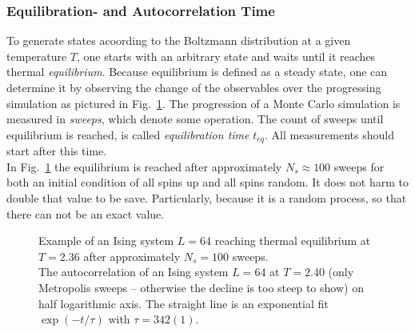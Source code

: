     \subsubsection{Equilibration- and Autocorrelation Time}
    \label{sssec:eqtime}
        To generate states acoording to the Boltzmann distribution at a
        given temperature \(T\), one starts with an arbitrary state
        and waits until it reaches thermal \emph{equilibrium}. Because
        equilibrium is defined as a steady state, one can determine it by
        observing the change of the observables over the progressing
        simulation as pictured in Fig.\ \ref{fig:equiandauto}.
        The progression of a Monte Carlo simulation is measured in \emph{sweeps},
        which denote some operation. The count of sweeps until
        equilibrium is reached, is called \emph{equilibration time} \(t_{eq}\).
        All measurements should start after this time.\\
        In Fig.\ \ref{fig:equiandauto}
        the equilibrium is reached after approximately \(N_{s} \approx 100\) sweeps for
        both an initial condition of all spins up and all spins random. It
        does not harm to double that value to be save. Particularly, because
        it is a random process, so that there can not be an exact value.
        \begin{figure}[htbp]
            \centering
            \caption[Examples for Equilibration and Autocorrelation]
            {
                 Example of an Ising system
                    \(L=64\) reaching thermal equilibrium at \(T=2.36\) after
                    approximately \(N_s=100\) sweeps.\\
                 The autocorrelation of an
                    Ising system \(L=64\) at \(T=2.40\) (only Metropolis
                    sweeps -- otherwise the decline is too steep to show)
                    on half logarithmic axis.
                    The straight line is an exponential fit \(\exp(-t/\tau)\)
                    with \(\tau = 342(1)\).
            }
            \label{fig:equiandauto}
        \end{figure}\\

